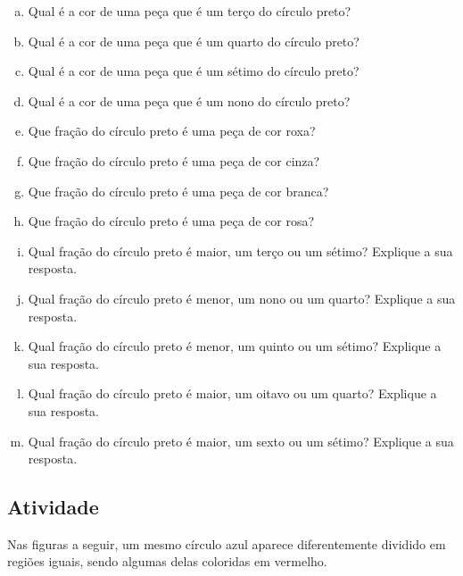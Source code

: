 \pagebreak
\begin{enumerate}[a)]
   \item  Qual é a cor de uma peça que é um terço do círculo preto?
  \item  Qual é a cor  de uma peça que é  um quarto do círculo preto?
  \item  Qual é  a cor de uma peça que é um sétimo do círculo preto?
  \item  Qual é a cor de uma peça que é  um nono do círculo preto?
  \item  Que fração do círculo preto é uma peça de cor roxa?
  \item  Que fração do círculo preto é uma peça de cor cinza?
  \item  Que fração do círculo preto é uma peça de cor branca?
  \item  Que fração do círculo preto é uma peça de cor rosa?
  \item  Qual fração do círculo preto é maior, um terço ou um sétimo? Explique a sua resposta.
  \item  Qual fração do círculo preto é menor, um nono ou um quarto? Explique a sua resposta.
  \item  Qual fração do círculo preto é menor, um quinto ou um sétimo? Explique a sua resposta.
  \item  Qual fração do círculo preto é maior, um oitavo ou um quarto? Explique a sua resposta.
  \item  Qual fração do círculo preto é maior, um sexto ou um sétimo? Explique a sua resposta.
\end{enumerate}

\subsection{Atividade}

Nas figuras a seguir, um mesmo círculo azul aparece diferentemente dividido em regiões iguais, sendo algumas delas coloridas em vermelho.


